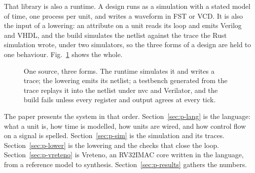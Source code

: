 \documentclass[journal,9pt]{IEEEtran}
\begin{document}
That library is also a runtime. A design runs as a simulation with a
stated model of time, one process per unit, and writes a waveform in
FST or VCD. It is also the input of a lowering: an attribute on a
unit reads its  loop and emits Verilog and VHDL, and the
build simulates the netlist against the trace the Rust simulation
wrote, under two simulators, so the three forms of a design are held
to one behaviour. Fig.~\ref{fig:p-system} shows the whole.

\begin{figure}[htbp]
\centering
{}
\caption{One source, three forms. The runtime simulates it and writes a
trace; the lowering emits its netlist; a testbench generated from the
trace replays it into the netlist under nvc and Verilator, and the
build fails unless every register and output agrees at every tick.}
\label{fig:p-system}
\end{figure}

The paper presents the system in that order. Section~\ref{sec:p-lang}
is the language: what a unit is, how time is modelled, how units are
wired, and how control flow on a signal is spelled.
Section~\ref{sec:p-sim} is the simulation and its traces.
Section~\ref{sec:p-lower} is the lowering and the checks that close
the loop. Section~\ref{sec:p-vreteno} is Vreteno, an RV32IMAC core
written in the language, from a reference model to synthesis.
Section~\ref{sec:p-results} gathers the numbers.
\end{document}
